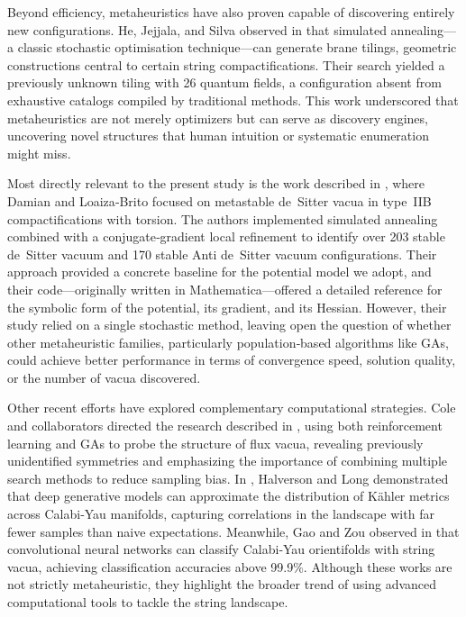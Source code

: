 \documentclass[runningheads]{llncs}
\begin{document}
Beyond efficiency, metaheuristics have also proven capable
of discovering entirely new configurations. He, Jejjala,
and Silva observed in \cite{He2025} that simulated
annealing—a classic stochastic optimisation technique—can
generate brane tilings, geometric constructions central
to certain string compactifications. Their search yielded
a previously unknown tiling with 26 quantum fields, a
configuration absent from exhaustive catalogs compiled by
traditional methods. This work underscored that
metaheuristics are not merely optimizers but can serve as
discovery engines, uncovering novel structures that human
intuition or systematic enumeration might miss.

Most directly relevant to the present study is the work
described in \cite{Damian2022}, where Damian and
Loaiza‑Brito focused on metastable de~Sitter vacua in
type~IIB compactifications with torsion. The authors
implemented simulated annealing combined with a
conjugate‑gradient local refinement to identify over 203
stable de~Sitter vacuum and 170 stable Anti de~Sitter
vacuum configurations. Their approach provided a
concrete baseline for the potential model we adopt, and
their code—originally written in Mathematica—offered a
detailed reference for the symbolic form of the potential,
its gradient, and its Hessian. However, their study relied
on a single stochastic method, leaving open the question
of whether other metaheuristic families, particularly
population‑based algorithms like GAs, could achieve better
performance in terms of convergence speed, solution
quality, or the number of vacua discovered.

Other recent efforts have explored complementary
computational strategies. Cole and collaborators directed
the research described in \cite{Cole2021}, using both
reinforcement learning and GAs to probe the structure of
flux vacua, revealing previously unidentified symmetries
and emphasizing the importance of combining multiple
search methods to reduce sampling bias.
In \cite{Halverson2020}, Halverson and Long demonstrated
that deep generative models can approximate the
distribution of Kähler metrics across Calabi‑Yau
manifolds, capturing correlations in the landscape with
far fewer samples than naive expectations. Meanwhile,
Gao and Zou observed in \cite{Gao2022} that
convolutional neural networks can classify Calabi‑Yau
orientifolds with string vacua, achieving classification
accuracies above 99.9\%. Although these works are not
strictly metaheuristic, they highlight the broader trend
of using advanced computational tools to tackle the
string landscape.
\end{document}

